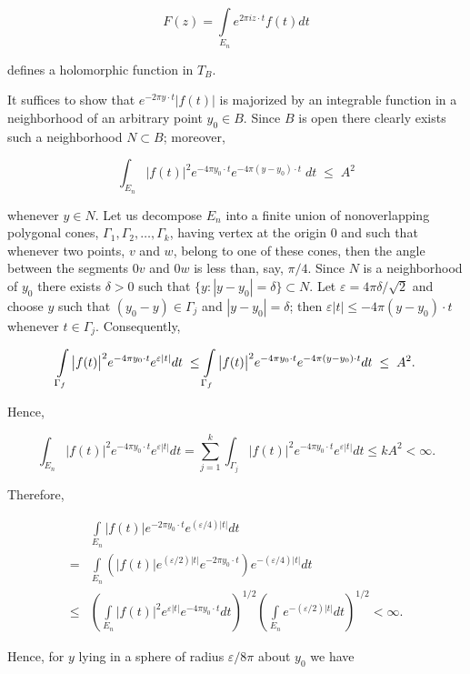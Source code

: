 \begin{equation}\label{eq:c3-2-2}
F(z)=\int\limits_{E_{n}}e^{2\pi i z\cdot t}f(t)d t
\end{equation}

defines a holomorphic function in $T_{B}$.

It suffices to show that $e^{-2\pi y \cdot t}|f(t)|$ is majorized by an integrable function in a neighborhood of an arbitrary point $y_0 \in B$. Since $B$ is open there clearly exists such a neighborhood $N \subset B$; moreover,

\[
\int_{E_{n}}\bigl|f(t)\bigr|^{2}e^{-4\pi y_{0}\cdot t}e^{-4\pi(y-y_{0})\cdot t}\;d t\;\leq\;A^{2}
\]

whenever $y \in N$. Let us decompose $E_n$ into a finite union of nonoverlapping polygonal cones, $\Gamma_1, \Gamma_2, \ldots, \Gamma_k$, having vertex at the origin $0$ and such that whenever two points, $v$ and $w$, belong to one of these cones, then the angle between the segments $0v$ and $0w$ is less than, say, $\pi/4$. Since $N$ is a neighborhood of $y_0$ there exists $\delta > 0$ such that $\{y: |y - y_0| = \delta\} \subset N$. Let $\varepsilon = 4\pi\delta/\sqrt{2}$ and choose $y$ such that $(y_0 - y) \in \Gamma_j$ and $|y - y_0| = \delta$; then $\varepsilon|t| \leq -4\pi(y - y_0) \cdot t$ whenever $t \in \Gamma_j$. Consequently,

\[
\intop_{\Gamma_{f}}\big|f(t)\big|^{2}e^{-4\pi y_{0}\cdot t}e^{\varepsilon|t|}d t\;\leq\intop_{\Gamma_{f}}\big|f(t)\big|^{2}e^{-4\pi y_{0}\cdot t}e^{-4\pi(y-y_{0})\cdot t}d t\;\leq\;A^{2}.
\]

Hence,

\[
\int_{E_{n}}|f(t)|^{2}e^{-4\pi y_{0}\cdot t}e^{\varepsilon|t|}d t=\sum_{j=1}^{k}\int_{\Gamma_{j}}|f(t)|^{2}e^{-4\pi y_{0}\cdot t}e^{\varepsilon|t|}d t\leq k A^{2}<\infty.
\]

Therefore,

\[
\begin{aligned}&\int\limits_{E_{n}}|f(t)|e^{-2\pi y_{0}\cdot t}e^{(\varepsilon/4)|t|}dt\\=&\int\limits_{E_{n}}(|f(t)|e^{(\varepsilon/2)|t|}e^{-2\pi y_{0}\cdot t})e^{-(\varepsilon/4)|t|}dt\\\leq&\left(\int\limits_{E_{n}}|f(t)|^{2}e^{\varepsilon|t|}e^{-4\pi y_{0}\cdot t}dt\right)^{1/2}\left(\int\limits_{E_{n}}e^{-(\varepsilon/2)|t|}dt\right)^{1/2}<\infty.\end{aligned}
\]

Hence, for $y$ lying in a sphere of radius $\varepsilon/8\pi$ about $y_0$ we have

